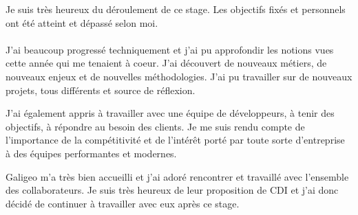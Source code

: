 \documentclass{themeensg}
\begin{document}
  Je suis très heureux du déroulement de ce stage. Les objectifs fixés et personnels ont été atteint et dépassé selon moi.

  \paragraph{}

  J'ai beaucoup progressé techniquement et j'ai pu approfondir les notions vues cette année qui me tenaient à coeur. J'ai découvert de nouveaux métiers, de nouveaux enjeux et de nouvelles méthodologies. J'ai pu travailler sur de nouveaux projets, tous différents et source de réflexion.

  J'ai également appris à travailler avec une équipe de développeurs, à tenir des objectifs, à répondre au besoin des clients. Je me suis rendu compte de l'importance de la compétitivité et de l'intérêt porté par toute sorte d'entreprise à des équipes performantes et modernes.

  Galigeo m'a très bien accueilli et j'ai adoré rencontrer et travaillé avec l'ensemble des collaborateurs. Je suis très heureux de leur proposition de CDI et j'ai donc décidé de continuer à travailler avec eux après ce stage.


\newevenpage
\printbibliography[title={Bibliographie}]
\nocite{*}

\newevenpage
\listoffigures

\newevenpage
\listoftables
\end{document}
